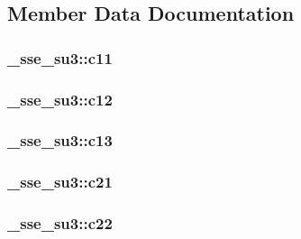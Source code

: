 \subsection{Member Data Documentation}
\hypertarget{struct__sse__su3_af55be7065f13472fda37c8fcd2cc13fc}{
\subsubsection[{c11}]{ {\bf \_\-sse\_\-su3::c11}}}
\label{struct__sse__su3_af55be7065f13472fda37c8fcd2cc13fc}
\hypertarget{struct__sse__su3_af5c46405e327d5d69cb30acf0e13bc16}{
\subsubsection[{c12}]{ {\bf \_\-sse\_\-su3::c12}}}
\label{struct__sse__su3_af5c46405e327d5d69cb30acf0e13bc16}
\hypertarget{struct__sse__su3_af320878329a13e1dc357aa1a28dce02c}{
\subsubsection[{c13}]{ {\bf \_\-sse\_\-su3::c13}}}
\label{struct__sse__su3_af320878329a13e1dc357aa1a28dce02c}
\hypertarget{struct__sse__su3_a3e1322a7b60971c25a83568bde448214}{
\subsubsection[{c21}]{ {\bf \_\-sse\_\-su3::c21}}}
\label{struct__sse__su3_a3e1322a7b60971c25a83568bde448214}
\hypertarget{struct__sse__su3_a59599dda56e3e1492f0182270f4f344d}{
\subsubsection[{c22}]{ {\bf \_\-sse\_\-su3::c22}}}
\label{struct__sse__su3_a59599dda56e3e1492f0182270f4f344d}
